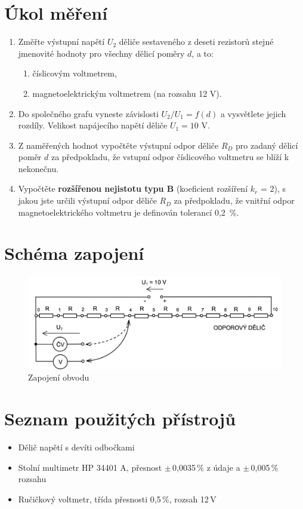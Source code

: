 \documentclass[a4paper,12pt]{article}   %
\begin{document}
\section{Úkol měření}
\label{zadani}
\begin{enumerate}
    \item Změřte výstupní napětí $U_2$ děliče sestaveného z deseti rezistorů stejné jmenovité hodnoty pro všechny dělicí poměry $d$, a to:
    \begin{enumerate}[label=\alph*)]
        \item číslicovým voltmetrem,
        \item magnetoelektrickým voltmetrem (na rozsahu 12 V).
    \end{enumerate}
    \item Do společného grafu vyneste závislosti $U_2 / U_1 = f(d)$ a vysvětlete jejich rozdíly. Velikost napájecího napětí děliče $U_1 = \textrm{10 V}$.
    \item Z naměřených hodnot vypočtěte výstupní odpor děliče $R_D$ pro zadaný dělicí poměr $d$ za předpokladu, že vstupní odpor číslicového voltmetru se blíží k nekonečnu.
    \item Vypočtěte \textbf{rozšířenou nejistotu typu B} (koeficient rozšíření $k_r$ = 2), s jakou jste určili výstupní odpor děliče $R_D$ za předpokladu, že vnitřní odpor magnetoelektrického voltmetru je definován tolerancí 0,2~\%.

\end{enumerate}

\section{Schéma zapojení}
\label{schema_zapojeni}
\begin{figure}[h!]
    \centering
    \includegraphics[width=.8\textwidth]{schema.png}
    \caption{Zapojení obvodu \cite{navod}}
    \label{fig:zapojeni}
\end{figure}


\section{Seznam použitých přístrojů}
\begin{itemize}
    \item Dělič napětí s devíti odbočkami
    \item Stolní multimetr HP 34401 A, přesnost $\pm$\,0,0035\,\% z údaje a $\pm$\,0,005\,\% rozsahu
    \item Ručičkový voltmetr, třída přesnosti 0,5\,\%, rozsah 12\,V
\end{itemize}
\end{document}
